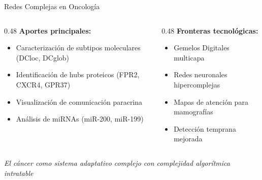 \documentclass[aspectratio=169, 11pt]{beamer}
\begin{document}
	\begin{frame}{Redes Complejas en Oncología}
		\begin{columns}
			\begin{column}{0.48\textwidth}
				\textbf{Aportes principales:}
				\begin{itemize}
					\item Caracterización de subtipos moleculares (DCloc, DCglob)
					\item Identificación de hubs proteicos (FPR2, CXCR4, GPR37)
					\item Visualización de comunicación paracrina
					\item Análisis de miRNAs (miR-200, miR-199)
				\end{itemize}
			\end{column}
			\begin{column}{0.48\textwidth}
				\textbf{Fronteras tecnológicas:}
				\begin{itemize}
					\item Gemelos Digitales multicapa
					\item Redes neuronales hipercomplejas
					\item Mapas de atención para mamografías
					\item Detección temprana mejorada
				\end{itemize}
			\end{column}
		\end{columns}
		
		\vspace{0.3cm}
		\centering
		\footnotesize \textit{El cáncer como sistema adaptativo complejo con complejidad algorítmica intratable}
	\end{frame}
	
\end{document}
